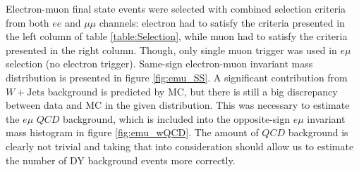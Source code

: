 \documentclass[a0,portrait]{a0poster}
\begin{document}
\begin{multicols}{2}
Electron-muon final state events were selected with combined selection criteria from both $ee$ and $\mu\mu$ channels:
electron had to satisfy the criteria presented in the left column of table \ref{table:Selection}, while muon had to satisfy
the criteria presented in the right column.
Though, only single muon trigger was used in $e\mu$ selection (no electron trigger).
Same-sign electron-muon invariant mass distribution is presented in figure \ref{fig:emu_SS}.
A significant contribution from $W+\mathrm{Jets}$ background is predicted by MC, but there is still a big discrepancy between
data and MC in the given distribution.
This was necessary to estimate the $e\mu$ $QCD$ background, which is included into the opposite-sign $e\mu$ invariant mass
histogram in figure \ref{fig:emu_wQCD}.
The amount of $QCD$ background is clearly not trivial and taking that into consideration should allow us to estimate the
number of DY background events more correctly.


\end{multicols}
\end{document}
